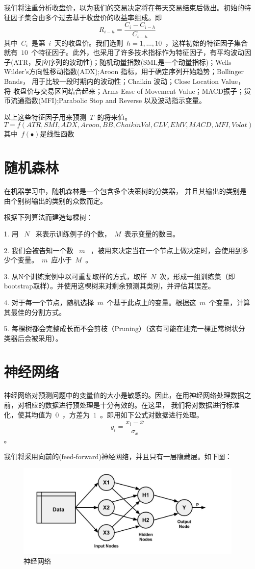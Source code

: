 \documentclass{article}\usepackage[]{graphicx}\usepackage[]{color}
\begin{document}
\begin{CJK*}{UTF8}{gkai}
我们将注重分析收盘价，以为我们的交易决定将在每天交易结束后做出。初始的特征因子集合由多个过去基于收盘价的收益率组成。即
$$R_{i-h} = \frac{C_i-C_{i-h}}{C_{i-h}}$$
其中~$C_i$~是第~$i$~天的收盘价。我们选则~$h = 1,\dots,10$~，这样初始的特征因子集合就有~$10$~个特征因子。此外，也采用了许多技术指标作为特征因子，有平均波动因子(ATR，反应序列的波动性)；随机动量指数(SMI,是一个动量指标)；Wells Wilder’s方向性移动指数(ADX);Aroon 指标，用于确定序列开始趋势；Bollinger Bands， 用于比较一段时期内的波动性；Chaikin 波动；Close Location Value，将
收盘价与交易区间结合起来；Arms Ease of Movement Value；MACD振子；货币流通指数(MFI);Parabolic Stop and Reverse 以及波动指示变量。

以上这些特征因子用来预测~$T$~的将来值。
$$T = f(ATR,SMI,ADX,Aroon,BB,ChaikinVol,CLV,EMV,MACD,MFI,Volat)$$
其中~$f(\bullet)$是线性函数
\section{随机森林}
在机器学习中，随机森林是一个包含多个决策树的分类器， 并且其输出的类别是由个别树输出的类别的众数而定。 

根据下列算法而建造每棵树：

1. 用 ~$N$~ 来表示训练例子的个数，~$M$~表示变量的数目。

2. 我们会被告知一个数 ~$m$~ ，被用来决定当在一个节点上做决定时，会使用到多少个变量。~$m$~应小于~$M$~。

3. 从N个训练案例中以可重复取样的方式，取样~$N$~次，形成一组训练集（即bootstrap取样）。并使用这棵树来对剩余预测其类别，并评估其误差。

4. 对于每一个节点，随机选择~$m$~个基于此点上的变量。根据这~$m$~个变量，计算其最佳的分割方式。

5. 每棵树都会完整成长而不会剪枝（Pruning）（这有可能在建完一棵正常树状分类器后会被采用）。

\section{神经网络}
神经网络对预测问题中的变量值的大小是敏感的。因此，在用神经网络处理数据之前，对相应的数据进行预处理是十分有效的。在这里， 我们将对数据进行标准化，使其均值为~$0$~，方差为~$1$~。即用如下公式对数据进行处理。
$$y_i = \frac{x_i - \overline{x}}{\sigma_x}$$。

我们将采用向前的(feed-forward)神经网络，并且只有一层隐藏层。如下图：
\begin{figure}[ht]
\centering
\includegraphics[width = 12cm]{./art.jpeg}
\caption{神经网络}\label{fig2.1}
\end{figure}

\end{CJK*}
\end{document}
